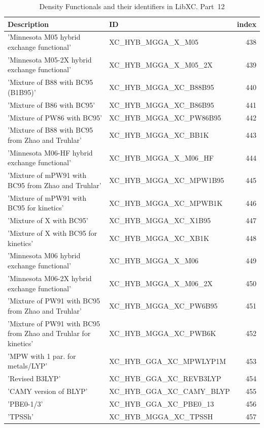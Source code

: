 \documentclass[final,12pt]{article}
\begin{document}
{{{{{{\begin{table}[!h]
\caption{Density Functionals and their identifiers in LibXC. Part~12}
\begin{center}
\begin{tabular}{llr}
\hline
\hline
Description & ID & index\\
\hline
  'Minnesota M05 hybrid exchange functional' & XC\_HYB\_MGGA\_X\_M05  &438\\
  'Minnesota M05-2X hybrid exchange functional' & XC\_HYB\_MGGA\_X\_M05\_2X  &439\\
  'Mixture of B88 with BC95 (B1B95)' & XC\_HYB\_MGGA\_XC\_B88B95  &440\\
  'Mixture of B86 with BC95' & XC\_HYB\_MGGA\_XC\_B86B95  &441\\
  'Mixture of PW86 with BC95' & XC\_HYB\_MGGA\_XC\_PW86B95  &442\\
  'Mixture of B88 with BC95 from Zhao and Truhlar' & XC\_HYB\_MGGA\_XC\_BB1K  &443\\
  'Minnesota M06-HF hybrid exchange functional' & XC\_HYB\_MGGA\_X\_M06\_HF  &444\\
  'Mixture of mPW91 with BC95 from Zhao and Truhlar' & XC\_HYB\_MGGA\_XC\_MPW1B95  &445\\
  'Mixture of mPW91 with BC95 for kinetics' & XC\_HYB\_MGGA\_XC\_MPWB1K  &446\\
  'Mixture of X with BC95' & XC\_HYB\_MGGA\_XC\_X1B95  &447\\
  'Mixture of X with BC95 for kinetics' & XC\_HYB\_MGGA\_XC\_XB1K  &448\\
  'Minnesota M06 hybrid exchange functional' & XC\_HYB\_MGGA\_X\_M06  &449\\
  'Minnesota M06-2X hybrid exchange functional' & XC\_HYB\_MGGA\_X\_M06\_2X  &450\\
  'Mixture of PW91 with BC95 from Zhao and Truhlar' & XC\_HYB\_MGGA\_XC\_PW6B95  &451\\
  'Mixture of PW91 with BC95 from Zhao and Truhlar for kinetics' & XC\_HYB\_MGGA\_XC\_PWB6K  &452\\
  'MPW with 1 par. for metals/LYP' & XC\_HYB\_GGA\_XC\_MPWLYP1M  &453\\
  'Revised B3LYP' & XC\_HYB\_GGA\_XC\_REVB3LYP  &454\\
  'CAMY version of BLYP' & XC\_HYB\_GGA\_XC\_CAMY\_BLYP  &455\\
  'PBE0-1/3' & XC\_HYB\_GGA\_XC\_PBE0\_13  &456\\
  'TPSSh' & XC\_HYB\_MGGA\_XC\_TPSSH  &457\\

\end{tabular}
\end{center}
\end{table}}}}}}}
\end{document}
